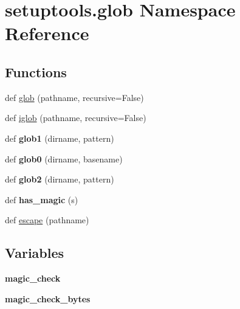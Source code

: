\hypertarget{namespacesetuptools_1_1glob}{}\section{setuptools.\+glob Namespace Reference}
\label{namespacesetuptools_1_1glob}
\subsection*{Functions}
\begin{DoxyCompactItemize}
\item 
def \hyperlink{namespacesetuptools_1_1glob_aaa3481017d8575f370da9768113e795f}{glob} (pathname, recursive=False)
\item 
def \hyperlink{namespacesetuptools_1_1glob_a785709f6dd54bc19304bb581cc6e7707}{iglob} (pathname, recursive=False)
\item 
\mbox{\label{namespacesetuptools_1_1glob_a44ead1132e5a984ad1edd86a4b643141}} 
def {\bfseries glob1} (dirname, pattern)
\item 
\mbox{\label{namespacesetuptools_1_1glob_a75dda51129cf0b110589765487cb12dd}} 
def {\bfseries glob0} (dirname, basename)
\item 
\mbox{\label{namespacesetuptools_1_1glob_a314c02b7732b13b3a0c129a7282b55ef}} 
def {\bfseries glob2} (dirname, pattern)
\item 
\mbox{\label{namespacesetuptools_1_1glob_aab80b9560e1118922c32b88a7b758288}} 
def {\bfseries has\+\_\+magic} (s)
\item 
def \hyperlink{namespacesetuptools_1_1glob_a73ffea4dfe02e8a0294dad20dbb55a0a}{escape} (pathname)
\end{DoxyCompactItemize}
\subsection*{Variables}
\begin{DoxyCompactItemize}
\item 
\mbox{\label{namespacesetuptools_1_1glob_a8b4aa8dfe849c42d139011a8050da833}} 
{\bfseries magic\+\_\+check}
\item 
\mbox{\label{namespacesetuptools_1_1glob_a6004b75354404430fa928ea3dd63792c}} 
{\bfseries magic\+\_\+check\+\_\+bytes}
\end{DoxyCompactItemize}



